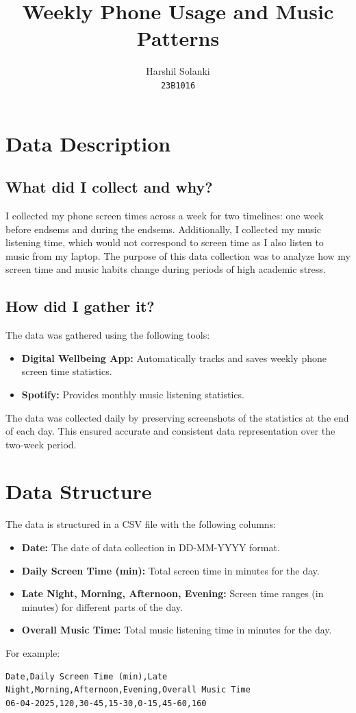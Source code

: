 \documentclass[24pt]{article}
\title{Weekly Phone Usage and Music Patterns}
\author{
  Harshil Solanki\\
  \texttt{23B1016}
}
\date{}
\begin{document}
\maketitle

\section{Data Description}
\subsection*{What did I collect and why?}
I collected my phone screen times across a week for two timelines: one week before endsems and during the endsems. Additionally, I collected my music listening time, which would not correspond to screen time as I also listen to music from my laptop. The purpose of this data collection was to analyze how my screen time and music habits change during periods of high academic stress.

\subsection*{How did I gather it?}
The data was gathered using the following tools:
\begin{itemize}
    \item \textbf{Digital Wellbeing App:} Automatically tracks and saves weekly phone screen time statistics.
    \item \textbf{Spotify:} Provides monthly music listening statistics.
\end{itemize}
The data was collected daily by preserving screenshots of the statistics at the end of each day. This ensured accurate and consistent data representation over the two-week period.

\section{Data Structure}
The data is structured in a CSV file with the following columns:
\begin{itemize}
    \item \textbf{Date:} The date of data collection in DD-MM-YYYY format.
    \item \textbf{Daily Screen Time (min):} Total screen time in minutes for the day.
    \item \textbf{Late Night, Morning, Afternoon, Evening:} Screen time ranges (in minutes) for different parts of the day.
    \item \textbf{Overall Music Time:} Total music listening time in minutes for the day.
\end{itemize}
For example:
\begin{verbatim}
Date,Daily Screen Time (min),Late Night,Morning,Afternoon,Evening,Overall Music Time
06-04-2025,120,30-45,15-30,0-15,45-60,160
\end{verbatim}
\end{document}
